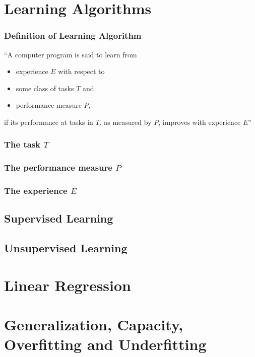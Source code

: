 \documentclass{beamer}
\begin{document}
\section{Learning Algorithms}

\begin{frame}
  \frametitle{Definition of Learning Algorithm}

  ``A computer program is said to learn from
  \begin{itemize}
    \item[\checkmark] experience $E$ with respect to
    \item[\checkmark] some class of tasks $T$ and
    \item[\checkmark] performance measure $P$,
  \end{itemize}
  if its performance at tasks in $T$, as measured by $P$, improves with experience $E$'' \cite{mitchelltm1997}

\end{frame}

\begin{frame}
  \frametitle{The task $T$}
\end{frame}

\begin{frame}
  \frametitle{The performance measure $P$}
\end{frame}

\begin{frame}
  \frametitle{The experience $E$}
\end{frame}

\subsection{Supervised Learning}

\subsection{Unsupervised Learning}

\section{Linear Regression}

\begin{frame}
  \frametitle{}
\end{frame}

\section{Generalization, Capacity, Overfitting and Underfitting}
\end{document}
